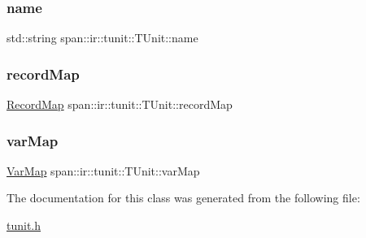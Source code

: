 \subsubsection{\texorpdfstring{name}{name}}
{\footnotesize\ttfamily std\+::string span\+::ir\+::tunit\+::\+T\+Unit\+::name\hspace{0.3cm}{\ttfamily [private]}}

\mbox{\label{classspan_1_1ir_1_1tunit_1_1TUnit_ac1c89020cf1138a326821d2d61bf9ebe}} 
\subsubsection{\texorpdfstring{record\+Map}{recordMap}}
{\footnotesize\ttfamily \hyperlink{namespacespan_1_1ir_1_1tunit_a466edb24fa3caa23d32ca7bc2cdeac12}{Record\+Map} span\+::ir\+::tunit\+::\+T\+Unit\+::record\+Map\hspace{0.3cm}{\ttfamily [private]}}

\mbox{\label{classspan_1_1ir_1_1tunit_1_1TUnit_a9e94f144516f56f7a28a62e4da5e56dc}} 
\subsubsection{\texorpdfstring{var\+Map}{varMap}}
{\footnotesize\ttfamily \hyperlink{namespacespan_1_1ir_1_1tunit_ab87decca6ee3f2091cb24b47d831aa44}{Var\+Map} span\+::ir\+::tunit\+::\+T\+Unit\+::var\+Map\hspace{0.3cm}{\ttfamily [private]}}



The documentation for this class was generated from the following file\+:\begin{DoxyCompactItemize}
\item 
\hyperlink{tunit_8h}{tunit.\+h}\end{DoxyCompactItemize}
